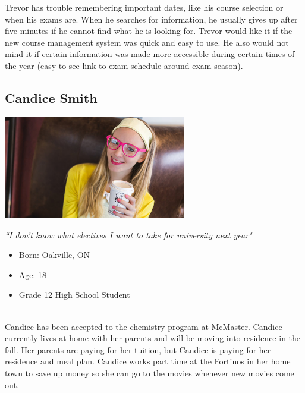\documentclass[10pt]{article}
\begin{document}
Trevor has trouble remembering important dates, like his course selection or when his exams are. When he searches for information, he usually gives up after five minutes if he cannot find what he is looking for. Trevor would like it if the new course management system was quick and easy to use. He also would not mind it if certain information was made more accessible during certain times of the year (easy to see link to exam schedule around exam season).

\newpage
\subsection*{Candice Smith}

\begin{minipage}{80mm}
\includegraphics[width=80mm]{Candice.jpg}
\begin{center}
\emph{``I don't know what electives I want to take for university next year"}
\end{center}
\end{minipage} \hfill
\begin{minipage}{\textwidth}
\begin{itemize}
\item Born: Oakville, ON
\item Age: 18
\item Grade 12 High School Student
\end{itemize}
\end{minipage}\\


Candice has been accepted to the chemistry program at McMaster. Candice currently lives at home with her parents and will be moving into residence in the fall. Her parents are paying for her tuition, but Candice is paying for her residence and meal plan. Candice works part time at the Fortinos in her home town to save up money so she can go to the movies whenever new movies come out.
\end{document}
